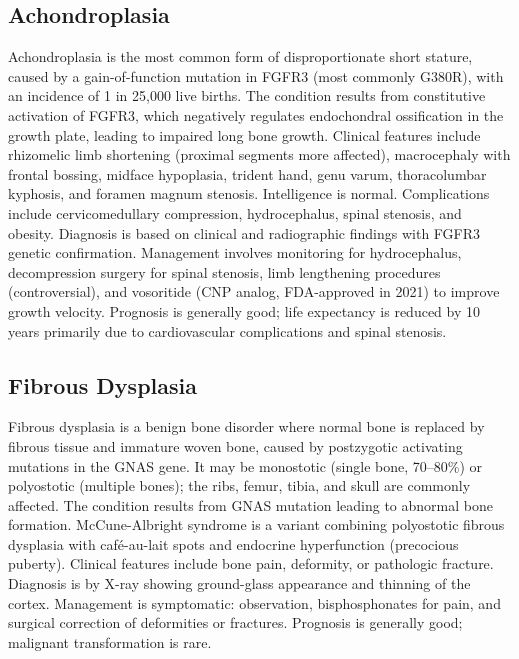 \subsection{Achondroplasia}
\label{sec:Achondroplasia}
Achondroplasia is the most common form of disproportionate short stature, caused by a gain-of-function mutation in FGFR3 (most commonly G380R), with an incidence of 1 in 25,000 live births. The condition results from constitutive activation of FGFR3, which negatively regulates endochondral ossification in the growth plate, leading to impaired long bone growth. Clinical features include rhizomelic limb shortening (proximal segments more affected), macrocephaly with frontal bossing, midface hypoplasia, trident hand, genu varum, thoracolumbar kyphosis, and foramen magnum stenosis. Intelligence is normal. Complications include cervicomedullary compression, hydrocephalus, spinal stenosis, and obesity. Diagnosis is based on clinical and radiographic findings with FGFR3 genetic confirmation. Management involves monitoring for hydrocephalus, decompression surgery for spinal stenosis, limb lengthening procedures (controversial), and vosoritide (CNP analog, FDA-approved in 2021) to improve growth velocity. Prognosis is generally good; life expectancy is reduced by 10 years primarily due to cardiovascular complications and spinal stenosis.

\subsection{Fibrous Dysplasia}
\label{sec:Fibrous Dysplasia}
Fibrous dysplasia is a benign bone disorder where normal bone is replaced by fibrous tissue and immature woven bone, caused by postzygotic activating mutations in the GNAS gene. It may be monostotic (single bone, 70--80\%) or polyostotic (multiple bones); the ribs, femur, tibia, and skull are commonly affected. The condition results from GNAS mutation leading to abnormal bone formation. McCune-Albright syndrome is a variant combining polyostotic fibrous dysplasia with caf\'{e}-au-lait spots and endocrine hyperfunction (precocious puberty). Clinical features include bone pain, deformity, or pathologic fracture. Diagnosis is by X-ray showing ground-glass appearance and thinning of the cortex. Management is symptomatic: observation, bisphosphonates for pain, and surgical correction of deformities or fractures. Prognosis is generally good; malignant transformation is rare.

